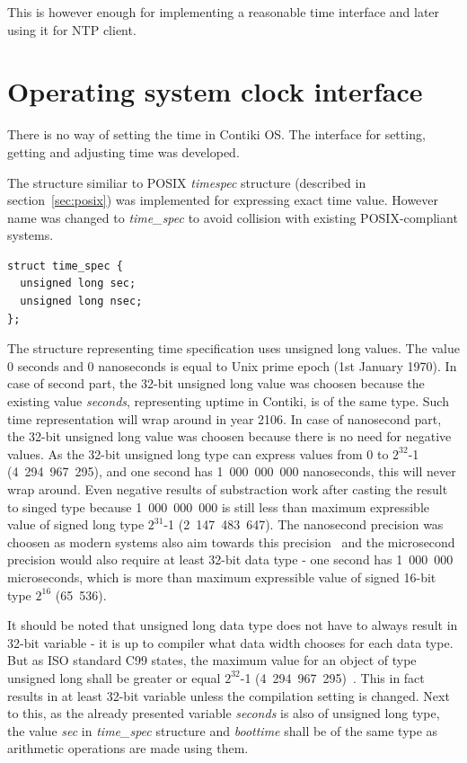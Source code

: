 
This is however enough for implementing a reasonable time interface and later using it for NTP client.



\section{Operating system clock interface}
There is no way of setting the time in Contiki OS.
The interface for setting, getting and adjusting time was developed.

The structure similiar to POSIX {\it{timespec}} structure (described in section~\ref{sec:posix})
was implemented for expressing exact time value.
However name was changed to {\it{time\_spec}} to avoid collision with existing POSIX-compliant systems.
\begin{lstlisting}
struct time_spec {
  unsigned long sec;
  unsigned long nsec;
};
\end{lstlisting}
The structure representing time specification uses unsigned long values.
The value 0 seconds and 0 nanoseconds is equal to Unix prime epoch (1st January 1970).
In case of second part, the 32-bit unsigned long value was choosen because the existing value
{\it{seconds}}, representing uptime in Contiki, is of the same type.
Such time representation will wrap around in year 2106.
In case of nanosecond part, the 32-bit unsigned long value was choosen because there is no need
for negative values.
As the 32-bit unsigned long type can express values from 0 to $2^{32}$-1 (4~294~967~295),
and one second has 1~000~000~000 nanoseconds, this will never wrap around.
Even negative results of substraction work after casting the result to singed type
because 1~000~000~000 is still less than maximum expressible value of signed long type $2^{31}$-1 (2~147~483~647).
The nanosecond precision was choosen as modern systems also aim towards this precision~\cite{posix,ntp-precision} and
the microsecond precision would also require at least 32-bit data type -
one second has 1~000~000 microseconds, which is more than maximum expressible value of signed 16-bit
type $2^{16}$ (65~536).

It should be noted that unsigned long data type does not have to always result in 32-bit variable -
it is up to compiler what data width chooses for each data type.
But as ISO standard C99 states, the maximum value for an object of type unsigned long
shall be greater or equal $2^{32}$-1 (4~294~967~295)~\cite{c99}.
This in fact results in at least 32-bit variable unless the compilation setting is changed.
Next to this, as the already presented variable {\it{seconds}} is also of unsigned long type,
the value {\it{sec}} in {\it{time\_spec}} structure and {\it{boottime}}
shall be of the same type as arithmetic operations are made using them.

